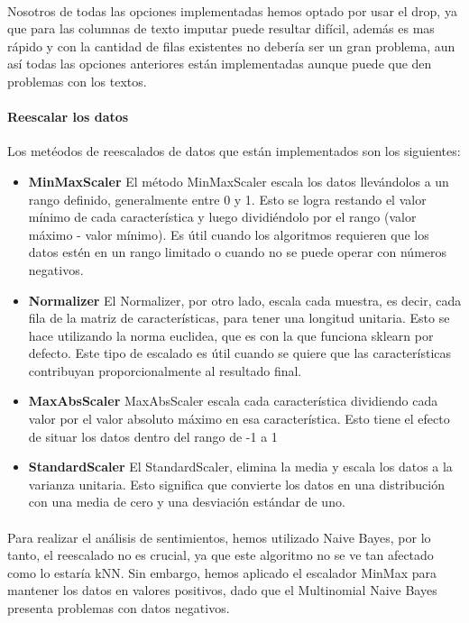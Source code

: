 \documentclass{report}
\begin{document}
{                \paragraph*{}{
                    Nosotros de todas las opciones implementadas hemos optado por usar el drop, ya que para las columnas de texto imputar puede resultar difícil, además es mas rápido y con la cantidad de filas existentes no debería ser un gran problema, aun así todas las opciones anteriores están implementadas aunque puede que den problemas con los textos.
                }
                \paragraph*{Reescalar los datos} 
                {
                Los metéodos de reescalados de datos que están implementados son los siguientes:
                }
                \begin{itemize}
                    \item \textbf{MinMaxScaler}   
                        El método MinMaxScaler escala los datos llevándolos a un rango definido, generalmente entre 0 y 1. Esto se logra restando el valor mínimo de cada característica y luego dividiéndolo por el rango (valor máximo - valor mínimo). Es útil cuando los algoritmos requieren que los datos estén en un rango limitado o cuando no se puede operar con números negativos.
                    \item \textbf{Normalizer}   
                        El Normalizer, por otro lado, escala cada muestra, es decir, cada fila de la matriz de características, para tener una longitud unitaria. Esto se hace utilizando la norma euclidea, que es con la que funciona sklearn por defecto. Este tipo de escalado es útil cuando se quiere que las características contribuyan proporcionalmente al resultado final.
                    \item \textbf{MaxAbsScaler}   
                        MaxAbsScaler escala cada característica dividiendo cada valor por el valor absoluto máximo en esa característica. Esto tiene el efecto de situar los datos dentro del rango de -1 a 1
                    \item \textbf{StandardScaler}   
                        El StandardScaler, elimina la media y escala los datos a la varianza unitaria. Esto significa que convierte los datos en una distribución con una media de cero y una desviación estándar de uno.
                \end{itemize}
                \paragraph*{}{
                    Para realizar el análisis de sentimientos, hemos utilizado Naive Bayes, por lo tanto, el reescalado no es crucial, ya que este algoritmo no se ve tan afectado como lo estaría kNN. Sin embargo, hemos aplicado el escalador MinMax para mantener los datos en valores positivos, dado que el Multinomial Naive Bayes presenta problemas con datos negativos.
                }
}
\end{document}
